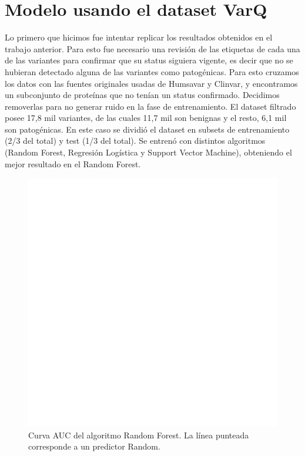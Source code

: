 \section{Modelo usando el dataset VarQ}

Lo primero que hicimos fue intentar replicar los resultados obtenidos en el trabajo anterior. Para esto fue necesario una revisión de las etiquetas de cada una de las variantes para confirmar que su status siguiera vigente, es decir que no se hubieran detectado alguna de las variantes como patogénicas. Para esto cruzamos los datos con las fuentes originales usadas de Humsavar y Clinvar, y encontramos un subconjunto de proteínas que no tenían un status confirmado. Decidimos removerlas para no generar ruido en la fase de entrenamiento.
El dataset filtrado posee 17,8 mil variantes, de las cuales 11,7 mil son benignas y el resto, 6,1 mil son patogénicas. En este caso se dividió el dataset en subsets de entrenamiento (2/3 del total) y test (1/3 del total). Se entrenó con distintos algoritmos (Random Forest, Regresión Logística y Support Vector Machine), obteniendo el mejor resultado en el Random Forest.  

\begin{figure}[H]
    \centering
    \includegraphics[scale=0.73]{documents/latex/figures/varq/auc_varq.pdf}
    \caption{Curva AUC del algoritmo Random Forest. La línea punteada corresponde a un predictor Random.}
    \label{fig:auc_1}
\end{figure}


